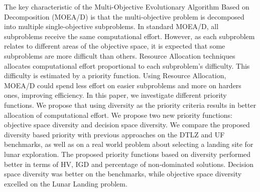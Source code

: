 The key characteristic of the Multi-Objective Evolutionary Algorithm Based on
Decomposition (MOEA/D) is that the multi-objective problem is decomposed into
multiple single-objective subproblems.
%
In standard MOEA/D, all subproblems receive the same computational effort.
However, as each subproblem relates to different areas of the objective space,
it is expected that some subproblems are more difficult than others.
%
Resource Allocation techniques allocates computational effort proportional to
each subproblem's difficulty. This difficulty is estimated by a priority
function. Using Resource Allocation, MOEA/D could spend less effort on easier
subproblems and more on harders ones, improving efficiency.
%
In this paper, we investigate different priority functions. We propose that
using diversity as the priority criteria results in better allocation of
computational effort.
%
We propose two new priority functions: objective space diversity and decision
space diversity.
%
We compare the proposed diversity based priority with previous approaches on the
DTLZ and UF benchmarks, as well as on a real world problem about selecting a
landing site for lunar exploration.
%
The proposed priority functions based on diversity performed better in terms of
HV, IGD and percentage of non-dominated solutions. Decision space diversity was
better on the benchmarks, while objective space diversity excelled on the Lunar
Landing problem.
